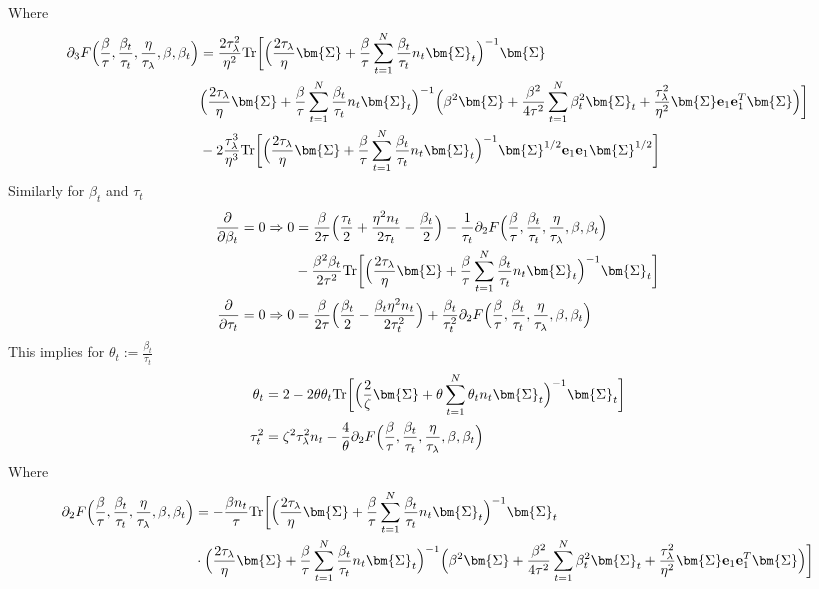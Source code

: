 \documentclass[final]{l4dc2026}
\newcommand{\bSigma}{\bm{\Sigma}}
\newcommand{\be}{\mathbf{e}}
\newcommand{\tr}{\text{Tr}}
\begin{document}
Where
\begin{align*}
    \partial_3 F\Bigl(\frac{\beta}{\tau}, \frac{\beta_t}{\tau_t}, \frac{\eta}{\tau_{\lambda}}, \beta, \beta_t\Bigr) &= \frac{2\tau_{\lambda}^2}{\eta^2} \tr \biggl[\Bigl(\frac{2\tau_{\lambda}}{\eta}\bSigma+\frac{\beta}{\tau}\sum_{t=1}^N \frac{\beta_t}{\tau_t} n_t \bSigma_t \Bigr)^{-1} \bSigma \\&\Bigl(\frac{2\tau_{\lambda}}{\eta}\bSigma+\frac{\beta}{\tau}\sum_{t=1}^N \frac{\beta_t}{\tau_t} n_t \bSigma_t \Bigr)^{-1} \Bigl(\beta^2 \bSigma + \frac{\beta^2}{4\tau^2} \sum_{t=1}^N \beta^2_t  \bSigma_t  + \frac{\tau_{\lambda}^2}{\eta^2}\bSigma \be_1 \be_1^T \bSigma\Bigr) \biggr] \\
    &- 2\frac{\tau_{\lambda}^3}{\eta^3} \tr \biggl[\Bigl(\frac{2\tau_{\lambda}}{\eta}\bSigma+\frac{\beta}{\tau}\sum_{t=1}^N \frac{\beta_t}{\tau_t} n_t \bSigma_t \Bigr)^{-1} \bSigma^{1/2} \be_1 \be_1 \bSigma^{1/2}\biggr]
\end{align*}
Similarly for $\beta_t$ and $\tau_t$
\begin{align*}
     \frac{\partial}{\partial \beta_t} = 0 \Rightarrow 0 &= \frac{\beta}{2\tau} \Bigl(\frac{\tau_t}{2} + \frac{\eta^2 n_t}{2\tau_t} - \frac{\beta_t}{2}\Bigr) - \frac{1}{\tau_t} \partial_2 F\Bigl(\frac{\beta}{\tau}, \frac{\beta_t}{\tau_t}, \frac{\eta}{\tau_{\lambda}}, \beta, \beta_t\Bigr) \\
     &- \frac{\beta^2 \beta_t}{2\tau^2}  \tr\biggl[ \Bigl(\frac{2\tau_{\lambda}}{\eta}\bSigma+\frac{\beta}{\tau}\sum_{t=1}^N \frac{\beta_t}{\tau_t} n_t \bSigma_t \Bigr)^{-1} \bSigma_t \biggr]\\
      \frac{\partial}{\partial \tau_t} = 0 \Rightarrow 0 &= \frac{\beta}{2\tau} \Bigl(\frac{\beta_t}{2} - \frac{\beta_t \eta^2 n_t}{2\tau_t^2} \Bigr) +  \frac{\beta_t}{\tau^2_t} \partial_2 F\Bigl(\frac{\beta}{\tau}, \frac{\beta_t}{\tau_t}, \frac{\eta}{\tau_{\lambda}}, \beta, \beta_t\Bigr)
\end{align*}
This implies for $\theta_t := \frac{\beta_t}{\tau_t}$
\begin{align*}
    \theta_t &= 2 - 2 \theta \theta_t \tr\biggl[ \Bigl(\frac{2}{\zeta}\bSigma+\theta\sum_{t=1}^N \theta_t n_t \bSigma_t \Bigr)^{-1} \bSigma_t \biggr] \\
    \tau_t^2 &= \zeta^2 \tau_{\lambda}^2 n_t - \frac{4}{\theta} \partial_2 F\Bigl(\frac{\beta}{\tau}, \frac{\beta_t}{\tau_t}, \frac{\eta}{\tau_{\lambda}}, \beta, \beta_t\Bigr)
\end{align*}
Where
\begin{align*}
     \partial_2 F\Bigl(\frac{\beta}{\tau}, \frac{\beta_t}{\tau_t}, \frac{\eta}{\tau_{\lambda}}, \beta, \beta_t\Bigr) &= - \frac{\beta n_t}{\tau}\tr\biggl[ \Bigl(\frac{2\tau_{\lambda}}{\eta}\bSigma+\frac{\beta}{\tau}\sum_{t=1}^N \frac{\beta_t}{\tau_t} n_t \bSigma_t \Bigr)^{-1} \bSigma_t  \\
     &\cdot \Bigl(\frac{2\tau_{\lambda}}{\eta}\bSigma+\frac{\beta}{\tau}\sum_{t=1}^N \frac{\beta_t}{\tau_t} n_t \bSigma_t \Bigr)^{-1} \Bigl(\beta^2 \bSigma + \frac{\beta^2}{4\tau^2} \sum_{t=1}^N \beta^2_t  \bSigma_t  + \frac{\tau_{\lambda}^2}{\eta^2}\bSigma \be_1 \be_1^T \bSigma\Bigr) \biggr] 
\end{align*}
\end{document}
